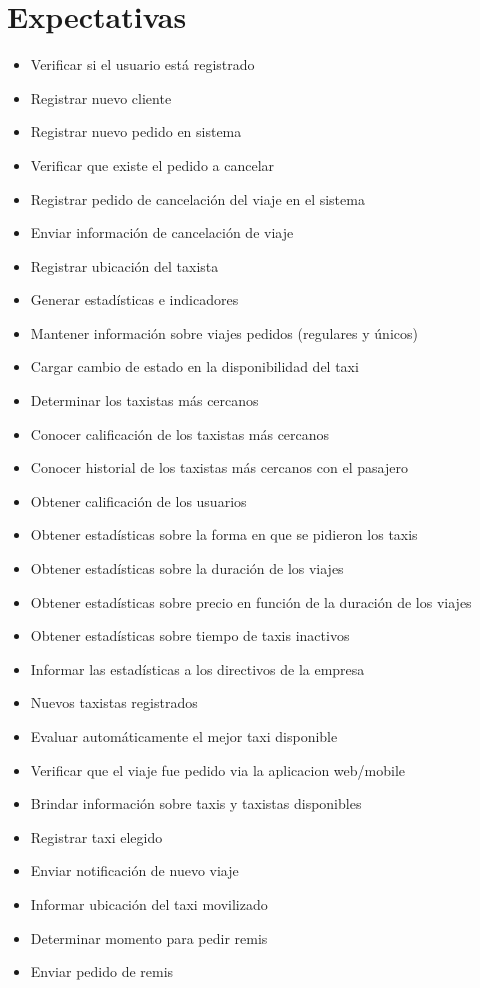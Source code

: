 \documentclass[a4paper]{article}
\begin{document}
\section{Expectativas}


\begin{itemize}
\item Verificar si el usuario est\'a registrado
\item Registrar nuevo cliente
\item Registrar nuevo pedido en sistema
\item Verificar que existe el pedido a cancelar
\item Registrar pedido de cancelaci\'on del viaje en el sistema
\item Enviar informaci\'on de cancelaci\'on de viaje
\item Registrar ubicaci\'on del taxista
\item Generar estad\'isticas e indicadores
\item Mantener informaci\'on sobre viajes pedidos (regulares  y \'unicos)
\item Cargar cambio de estado en la disponibilidad del taxi
\item Determinar los taxistas m\'as cercanos
\item Conocer calificaci\'on de los taxistas m\'as cercanos
\item Conocer historial de los taxistas m\'as cercanos con el pasajero
\item Obtener calificaci\'on de los usuarios
\item Obtener estad\'isticas sobre la forma en que se pidieron los taxis
\item Obtener estad\'isticas sobre la duraci\'on de los viajes
\item Obtener estad\'isticas sobre precio en funci\'on de la duraci\'on de los viajes
\item Obtener estad\'isticas sobre tiempo de taxis inactivos
\item Informar las estad\'isticas a los directivos de la empresa
\item Nuevos taxistas registrados
\item Evaluar autom\'aticamente el mejor taxi disponible
\item Verificar que el viaje fue pedido via la aplicacion web/mobile
\item Brindar informaci\'on sobre taxis y taxistas disponibles
\item Registrar taxi elegido
\item Enviar notificaci\'on de nuevo viaje
\item Informar ubicaci\'on del taxi movilizado
\item Determinar momento para pedir remis
\item Enviar pedido de remis

\end{itemize}
\end{document}
